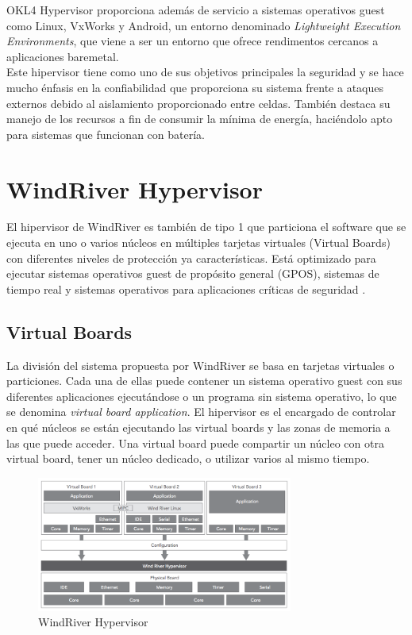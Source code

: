 OKL4 Hypervisor proporciona además de servicio a sistemas operativos guest como Linux, VxWorks y Android, un entorno denominado \textit{Lightweight Execution Environments}, que viene a ser un entorno que ofrece rendimentos cercanos a aplicaciones baremetal.\\
Este hipervisor tiene como uno de sus objetivos principales la seguridad \cite{okl4_2} y se hace mucho énfasis en la confiabilidad que proporciona su sistema frente a ataques externos debido al aislamiento proporcionado entre celdas. También destaca su manejo de los recursos a fin de consumir la mínima de energía, haciéndolo apto para sistemas que funcionan con batería.


\section{WindRiver Hypervisor}
El hipervisor de WindRiver es también de tipo 1 que particiona el software que se ejecuta en uno o varios núcleos en múltiples tarjetas virtuales (Virtual Boards) con diferentes niveles de protección ya características. Está optimizado para ejecutar sistemas operativos guest de propósito general (\acrshort{GPOS}), sistemas de tiempo real y sistemas operativos para aplicaciones críticas de seguridad \cite{windriver_1}.
\subsection{Virtual Boards}
La división del sistema propuesta por WindRiver se basa en tarjetas virtuales o particiones. Cada una de ellas puede contener un sistema operativo guest con sus diferentes aplicaciones ejecutándose o un programa sin sistema operativo, lo que se denomina \textit{virtual board application}. El hipervisor es el encargado de controlar en qué núcleos se están ejecutando las virtual boards y las zonas de memoria a las que puede acceder. Una virtual board puede compartir un núcleo con otra virtual board, tener un núcleo dedicado, o utilizar varios al mismo tiempo.
\begin{figure}[h]
	\centering
	\includegraphics[width=0.75\textwidth]{recursos/windriver_hyp.png}
	\caption{WindRiver Hypervisor}
	\label{fig:windriver_hyp}
\end{figure}

